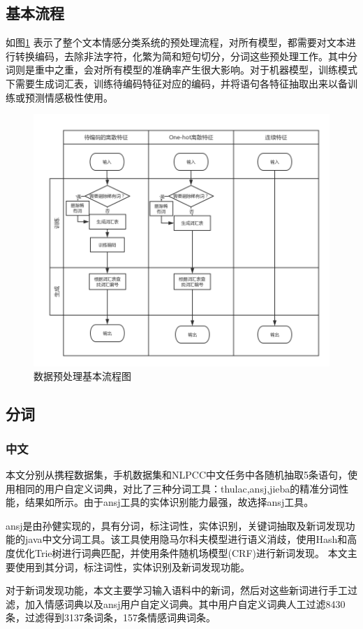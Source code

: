 \subsection{基本流程}
如图\ref{preprocessing} 表示了整个文本情感分类系统的预处理流程，对所有模型，都需要对文本进行转换编码，去除非法字符，化繁为简和短句切分，分词这些预处理工作。其中分词则是重中之重，会对所有模型的准确率产生很大影响。对于机器模型，训练模式下需要生成词汇表，训练待编码特征对应的编码，并将语句各特征抽取出来以备训练或预测情感极性使用。
\begin{figure}[!hbp]
\begin{center}
\includegraphics[width=\textwidth]{graphic/prepocessing.png}
\caption{数据预处理基本流程图 \label{preprocessing}}
\end{center}
\end{figure}

\subsection{分词}
\subsubsection{中文}
本文分别从携程数据集，手机数据集和NLPCC中文任务中各随机抽取5条语句，使用相同的用户自定义词典，对比了三种分词工具：thulac,ansj,jieba的精准分词性能，结果如所示。由于ansj工具的实体识别能力最强，故选择ansj工具。\par
ansj是由孙健实现的，具有分词，标注词性，实体识别，关键词抽取及新词发现功能的java中文分词工具。该工具使用隐马尔科夫模型进行语义消歧，使用Hash和高度优化Trie树进行词典匹配，并使用条件随机场模型(CRF)进行新词发现。\cite{ansjwiki} 本文主要使用到其分词，标注词性，实体识别及新词发现功能。\par
对于新词发现功能，本文主要学习输入语料中的新词，然后对这些新词进行手工过滤，加入情感词典以及ansj用户自定义词典。其中用户自定义词典人工过滤8430条，过滤得到3137条词条，157条情感词典词条。
